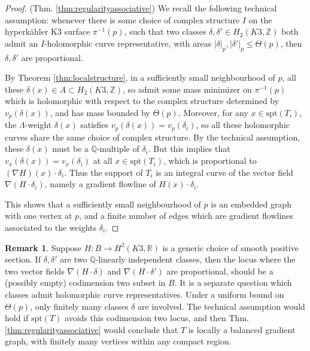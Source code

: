 \documentclass{article}
\theoremstyle{definition}
\newtheorem{rmk}{Remark}
\newcommand{\R}{\mathbb{R}}
\newcommand{\Z}{\mathbb{Z}}
\newcommand{\Q}{\mathbb{Q}}
\begin{document}
\begin{proof}
(Thm. \ref{thm:regularityassociative}) We recall the following technical assumption: whenever there is some choice of complex structure $I$ on the hyperk\"ahler K3 surface $\pi^{-1}(p)$, such that two classes $\delta, \delta'\in H_2(K3,\Z)$ both admit an $I$-holomorphic curve representative, with areas $|\delta|_p, |\delta'|_p \leq \Theta(p)$, then $\delta, \delta'$ are proportional.



By Theorem \ref{thm:localstructure},
in a sufficiently small neighbourhood of $p$, all these $\delta(x)\in A\subset H_2(K3, \Z)$, so admit some mass minimizer on $\pi^{-1}(p)$ which is holomorphic with respect to the complex structure determined by $v_p(\delta(x))$, and has mass bounded by $\Theta(p)$. Moreover, for any $x\in \text{spt}(T_i)$, the $\Lambda$-weight $\delta(x)$ satisfies $v_p(\delta(x))= v_p(\delta_i)$, so all these holomorphic curves share the same choice of complex structure. By the technical assumption, these $\delta(x)$ must be a $\Q$-multiple of $\delta_i$. But this implies that $v_x(\delta(x))= v_x(\delta_i)$ at all $x\in \text{spt}(T_i)$, which is proportional to $(\nabla H)(x)\cdot \delta_i$. Thus the support of $T_i$ is an integral curve of the vector field $\nabla (H\cdot \delta_i)$, namely a gradient flowline of $H(x)\cdot \delta_i$.


This shows that a sufficiently small neighbourhood of $p$ is an embedded graph with one vertex at $p$, and a finite number of edges which are gradient flowlines associated to the weights $\delta_i$.
\end{proof}

		
		
		
		
\begin{rmk}
Suppose $H: B\to H^2(K3,\R)$ is a generic choice of smooth positive section. If $\delta, \delta'$ are two $\Q$-linearly independent classes, then the locus where the two vector fields $\nabla (H\cdot \delta)$ and $\nabla (H\cdot \delta')$ are proportional, should be a (possibly empty) codimension two subset in $B$. It is a separate question which classes admit holomorphic curve representatives. Under a uniform bound on $\Theta(p)$, only finitely many classes $\delta$ are involved. The technical assumption would hold if $\text{spt}(T)$ avoids this codimension two locus, and then Thm. \ref{thm:regularityassociative} would conclude that $T$ is locally a balanced gradient graph, with finitely many vertices within any compact region.
\end{rmk}		
		
\end{document}
